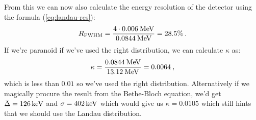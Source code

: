 \documentclass[10pt, titlepage, a4paper]{article}
\newcommand\thickbar[1]{\accentset{\rule{.5em}{.03em}}{#1}}
\renewcommand{\bar}{\thickbar}
\numberwithin{equation}{section}
\begin{document}
%
From this we can now also calculate the energy resolution of the detector using the formula (\ref{eq:landau-res}):
%
\begin{equation}
    R_{\rm{FWHM}} = \frac{4\cdot 0.006\>\rm{MeV}}{0.0844\>\rm{MeV}} = 28.5\%\>.
    \label{eq:2sub1-result}
\end{equation}
%
If we're paranoid if we've used the right distribution, we can calculate $\kappa$ as:
%
\begin{equation}
    \kappa = \frac{0.0844\>\rm{MeV}}{13.12\>\rm{MeV}} = 0.0064\>,
\end{equation}
%
which is less than $0.01$ so we've used the right distribution. Alternatively if we magically procure the 
result from the Bethe-Bloch equation, we'd get $\bar{\Delta} = 126\,\rm{keV}$ and $\sigma = 402\,\rm{keV}$ which would give
us $\kappa = 0.0105$ which still hints that we should use the Landau distribution.
\end{document}
